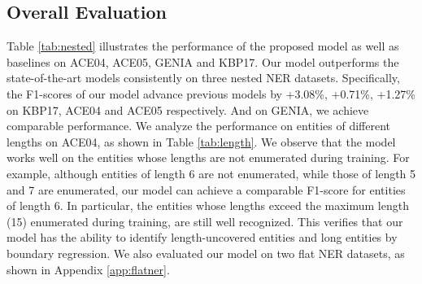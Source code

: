 \documentclass[11pt,a4paper]{article}
\begin{document}
\subsection{Overall Evaluation}


Table \ref{tab:nested} illustrates the performance of the proposed model as well as baselines on ACE04, ACE05, GENIA and KBP17. Our model outperforms the state-of-the-art models consistently on three nested NER datasets. Specifically, the F1-scores of our model advance previous models by +3.08\%, +0.71\%, +1.27\% on KBP17, ACE04 and ACE05 respectively. And on GENIA, we achieve comparable performance. We analyze the performance on entities of different lengths on ACE04, as shown in Table \ref{tab:length}. 
We observe that the model works well on the entities whose lengths are not enumerated during training.
For example, although entities of length 6 are not enumerated, while those of length 5 and 7 are enumerated, our model can achieve a comparable F1-score for entities of length 6. 
In particular, the entities whose lengths exceed the maximum length (15) enumerated during training, are still well recognized. 
This verifies that our model has the ability to identify length-uncovered entities and long entities by boundary regression. We also evaluated our model on two flat NER datasets, as shown in Appendix \ref{app:flatner}.
\end{document}
